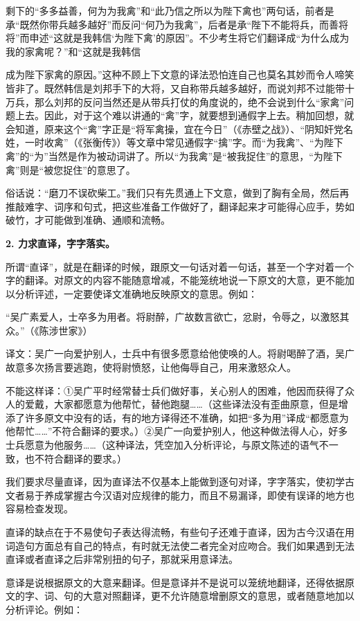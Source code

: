 剩下的“多多益善，何为为我禽”和“此乃信之所以为陛下禽也”两句话，前者是承“既然你带兵越多越好”而反问“何乃为我禽”，后者是承“陛下不能将兵，而善将将”而申述“这就是我韩信‘为陛下禽’的原因”。不少考生将它们翻译成“为什么成为我的家禽呢？”和“这就是我韩信

成为陛下家禽的原因。”这种不顾上下文意的译法恐怕连自己也莫名其妙而令人啼笑皆非了。既然韩信是刘邦手下的大将，又自称带兵越多越好，而说刘邦不过能带十万兵，那么刘邦的反问当然还是从带兵打仗的角度说的，绝不会说到什么“家禽”问题上去。因此，对于这个难以讲通的“禽”字，就要想到通假字上去。稍加回想，就会知道，原来这个“禽”字正是“将军禽操，宜在今日”（《赤壁之战》）、“阴知奸党名姓，一时收禽”（《张衡传》）等文章中常见通假字“擒”字。而“为我禽”、“为陛下禽”的“为”当然是作为被动词讲了。所以“为我禽”是“被我捉住”的意思，“为陛下禽”则是“被您捉住”的意思了。

俗话说：“磨刀不误砍柴工。”我们只有先贯通上下文意，做到了胸有全局，然后再推敲难字、词序和句式，把这些准备工作做好了，翻译起来才可能得心应手，势如破竹，才可能做到准确、通顺和流畅。

\textbf{2. 力求直译，字字落实。}

所谓“直译”，就是在翻译的时候，跟原文一句话对着一句话，甚至一个字对着一个字的翻译。对原文的内容不能随意增减，不能笼统地说一下原文的大意，更不能加以分析评述，一定要使译文准确地反映原文的意思。例如：

“吴广素爱人，士卒多为用者。将尉醉，广故数言欲亡，忿尉，令辱之，以激怒其众。”（《陈涉世家》）

译文：吴广一向爱护别人，士兵中有很多愿意给他使唤的人。将尉喝醉了酒，吴广故意多次扬言要逃跑，使将尉愤怒，让他侮辱自己，用来激怒众人。

不能这样译：①吴广平时经常替士兵们做好事，关心别人的困难，他因而获得了众人的爱戴，大家都愿意为他帮忙，替他跑腿……（这些译法没有歪曲原意，但是增添了许多原文中没有的话，有的地方译得还不准确，如把“多为用”译成“都愿意为他帮忙……”不符合翻译的要求。）②吴广一向爱护别人，他这种做法得人心，好多士兵愿意为他服务……（这种译法，凭空加入分析评论，与原文陈述的语气不一致，也不符合翻译的要求。）

我们要求尽量直译，因为直译法不仅基本上能做到逐句对译，字字落实，使初学古文者易于养成掌握古今汉语对应规律的能力，而且不易漏译，即使有误译的地方也容易检查发现。

直译的缺点在于不易使句子表达得流畅，有些句子还难于直译，因为古今汉语在用词造句方面总有自己的特点，有时就无法使二者完全对应吻合。我们如果遇到无法直译或者直译之后非常别扭的句子，那就采用意译法。

意译是说根据原文的大意来翻译。但是意译并不是说可以笼统地翻译，还得依据原文的字、词、句的大意对照翻译，更不允许随意增删原文的意思，或者随意地加以分析评论。例如：

